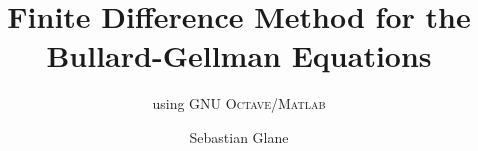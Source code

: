 %









\subject{Documentation}
\title{Finite Difference Method for the Bullard-Gellman Equations}
\subtitle{using \textsc{GNU Octave}/\textsc{Matlab}}
\author{Sebastian Glane}
\maketitle

